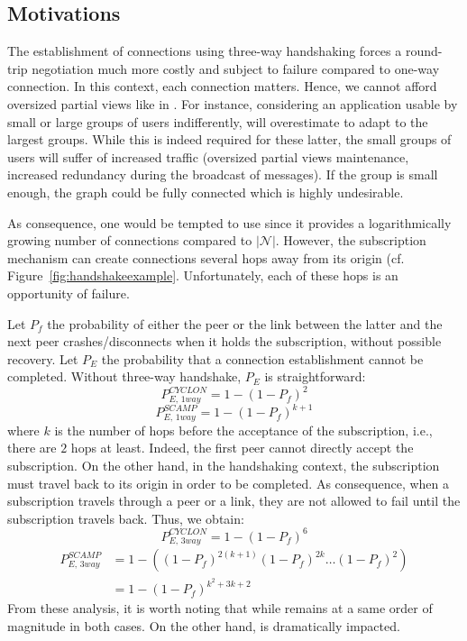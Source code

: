 \subsection{Motivations}
The establishment of connections using three-way handshaking forces a
round-trip negotiation much more costly and subject to failure compared to
one-way connection. In this context, each connection matters. Hence, we cannot
afford oversized partial views like in \CYCLON{}. For instance, considering an
application usable by small or large groups of users indifferently, \CYCLON{}
will overestimate to adapt to the largest groups. While this is indeed required
for these latter, the small groups of users will suffer of increased traffic
(oversized partial views maintenance, increased redundancy during the broadcast
of messages). If the group is small enough, the graph could be fully connected
which is highly undesirable.

As consequence, one would be tempted to use \SCAMP{} since it provides a
logarithmically growing number of connections compared to
$|\mathcal{N}|$. However, the \SCAMP{} subscription mechanism can create
connections several hops away from its origin
(cf. Figure~\ref{fig:handshakeexample}. Unfortunately, each of these hops is an
opportunity of failure.

Let $P_f$ the probability of either the peer or the link between the latter and
the next peer crashes/disconnects when it holds the subscription, without
possible recovery. Let $P_E$ the probability that a connection establishment
cannot be completed. Without three-way handshake, $P_E$ is straightforward:
\begin{equation} P_{E,\,1way}^{CYCLON}=1-(1- P_f)^2 \end{equation}
\begin{equation} P_{E,\,1way}^{SCAMP}=1-(1- P_f)^{k+1} \end{equation} where $k$
is the number of hops before the acceptance of the subscription, i.e., there
are $2$ hops at least. Indeed, the first peer cannot directly accept the
subscription. On the other hand, in the handshaking context, the subscription
must travel back to its origin in order to be completed. As consequence, when a
subscription travels through a peer or a link, they are not allowed to fail
until the subscription travels back. Thus, we obtain:
\begin{equation} P_{E,\,3way}^{CYCLON}=1-(1- P_f)^6\end{equation}
\begin{align} P_{E,\,3way}^{SCAMP} &=1 - ((1-P_f)^{2(k+1)} (1-P_f)^{2k}
                                     \ldots (1-P_f)^2) \nonumber \\
                                   &=1-(1-P_f)^{k^2+3k+2}
\end{align}
From these analysis, it is worth noting that while \CYCLON{} remains at a same
order of magnitude in both cases. On the other hand, \SCAMP{} is dramatically
impacted. 

